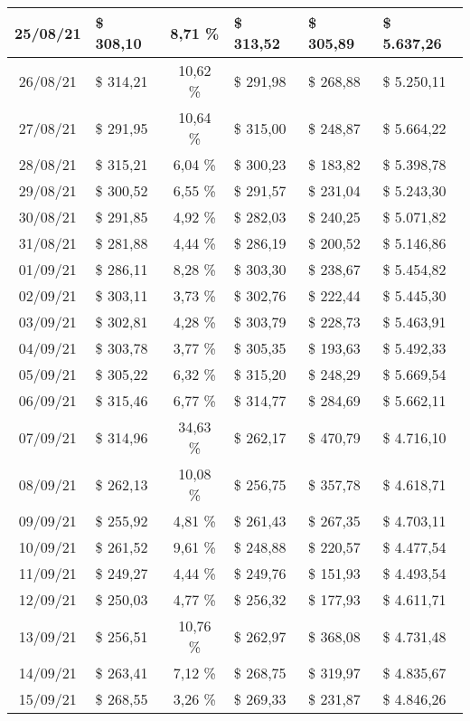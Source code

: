 \begin{center}
\begin{small}
\begin{longtable}{|c|l|c|l|l|l|}
25/08/21 & \$ 308,10 & 8,71 \% & \$ 313,52 & \$ 305,89 & \$ 5.637,26 \\ \hline
26/08/21 & \$ 314,21 & 10,62 \% & \$ 291,98 & \$ 268,88 & \$ 5.250,11 \\ \hline
27/08/21 & \$ 291,95 & 10,64 \% & \$ 315,00 & \$ 248,87 & \$ 5.664,22 \\ \hline
28/08/21 & \$ 315,21 & 6,04 \% & \$ 300,23 & \$ 183,82 & \$ 5.398,78 \\ \hline
29/08/21 & \$ 300,52 & 6,55 \% & \$ 291,57 & \$ 231,04 & \$ 5.243,30 \\ \hline
30/08/21 & \$ 291,85 & 4,92 \% & \$ 282,03 & \$ 240,25 & \$ 5.071,82 \\ \hline
31/08/21 & \$ 281,88 & 4,44 \% & \$ 286,19 & \$ 200,52 & \$ 5.146,86 \\ \hline
01/09/21 & \$ 286,11 & 8,28 \% & \$ 303,30 & \$ 238,67 & \$ 5.454,82 \\ \hline
02/09/21 & \$ 303,11 & 3,73 \% & \$ 302,76 & \$ 222,44 & \$ 5.445,30 \\ \hline
03/09/21 & \$ 302,81 & 4,28 \% & \$ 303,79 & \$ 228,73 & \$ 5.463,91 \\ \hline
04/09/21 & \$ 303,78 & 3,77 \% & \$ 305,35 & \$ 193,63 & \$ 5.492,33 \\ \hline
05/09/21 & \$ 305,22 & 6,32 \% & \$ 315,20 & \$ 248,29 & \$ 5.669,54 \\ \hline
06/09/21 & \$ 315,46 & 6,77 \% & \$ 314,77 & \$ 284,69 & \$ 5.662,11 \\ \hline
07/09/21 & \$ 314,96 & 34,63 \% & \$ 262,17 & \$ 470,79 & \$ 4.716,10 \\ \hline
08/09/21 & \$ 262,13 & 10,08 \% & \$ 256,75 & \$ 357,78 & \$ 4.618,71 \\ \hline
09/09/21 & \$ 255,92 & 4,81 \% & \$ 261,43 & \$ 267,35 & \$ 4.703,11 \\ \hline
10/09/21 & \$ 261,52 & 9,61 \% & \$ 248,88 & \$ 220,57 & \$ 4.477,54 \\ \hline
11/09/21 & \$ 249,27 & 4,44 \% & \$ 249,76 & \$ 151,93 & \$ 4.493,54 \\ \hline
12/09/21 & \$ 250,03 & 4,77 \% & \$ 256,32 & \$ 177,93 & \$ 4.611,71 \\ \hline
13/09/21 & \$ 256,51 & 10,76 \% & \$ 262,97 & \$ 368,08 & \$ 4.731,48 \\ \hline
14/09/21 & \$ 263,41 & 7,12 \% & \$ 268,75 & \$ 319,97 & \$ 4.835,67 \\ \hline
15/09/21 & \$ 268,55 & 3,26 \% & \$ 269,33 & \$ 231,87 & \$ 4.846,26 \\ \hline

\end{longtable}
\end{small}
\end{center}
